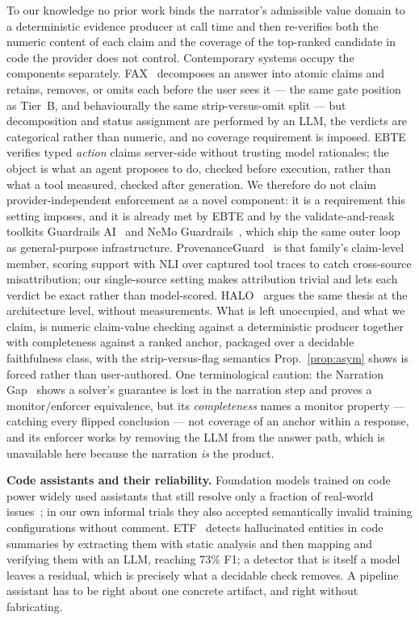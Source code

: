 \documentclass[conference]{IEEEtran}
\begin{document}
To our knowledge no prior work binds the narrator's admissible value domain to a deterministic evidence producer at call time and then re-verifies both the numeric content of each claim and the coverage of the top-ranked candidate in code the provider does not control. Contemporary systems occupy the components separately. FAX~\cite{kim2026fax} decomposes an answer into atomic claims and retains, removes, or omits each before the user sees it --- the same gate position as Tier~B, and behaviourally the same strip-versus-omit split --- but decomposition and status assignment are performed by an LLM, the verdicts are categorical rather than numeric, and no coverage requirement is imposed. EBTE~\cite{zhu2026ebte} verifies typed \emph{action} claims server-side without trusting model rationales; the object is what an agent proposes to do, checked before execution, rather than what a tool measured, checked after generation. We therefore do not claim provider-independent enforcement as a novel component: it is a requirement this setting imposes, and it is already met by EBTE and by the validate-and-reask toolkits Guardrails AI~\cite{guardrailsai} and NeMo Guardrails~\cite{nemo}, which ship the same outer loop as general-purpose infrastructure. ProvenanceGuard~\cite{alvarez2026provenanceguard} is that family's claim-level member, scoring support with NLI over captured tool traces to catch cross-source misattribution; our single-source setting makes attribution trivial and lets each verdict be exact rather than model-scored. HALO~\cite{raduta2026halo} argues the same thesis at the architecture level, without measurements. What is left unoccupied, and what we claim, is numeric claim-value checking against a deterministic producer together with completeness against a ranked anchor, packaged over a decidable faithfulness class, with the strip-versus-flag semantics Prop.~\ref{prop:asym} shows is forced rather than user-authored. One terminological caution: the Narration Gap~\cite{huang2026narration} shows a solver's guarantee is lost in the narration step and proves a monitor/enforcer equivalence, but its \emph{completeness} names a monitor property --- catching every flipped conclusion --- not coverage of an anchor within a response, and its enforcer works by removing the LLM from the answer path, which is unavailable here because the narration \emph{is} the product.

\textbf{Code assistants and their reliability.} Foundation models trained on code~\cite{codex} power widely used assistants that still resolve only a fraction of real-world issues~\cite{swebench}; in our own informal trials they also accepted semantically invalid training configurations without comment. ETF~\cite{maharaj2025etf} detects hallucinated entities in code summaries by extracting them with static analysis and then mapping and verifying them with an LLM, reaching 73\% F1; a detector that is itself a model leaves a residual, which is precisely what a decidable check removes. A pipeline assistant has to be right about one concrete artifact, and right without fabricating.
\end{document}
